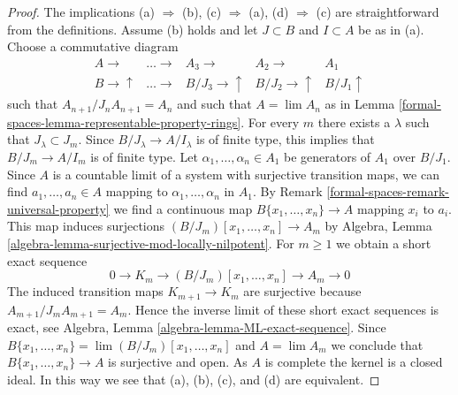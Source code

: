 \begin{proof}
The implications (a) $\Rightarrow$ (b), (c) $\Rightarrow$ (a),
(d) $\Rightarrow$ (c) are straightforward from the definitions.
Assume (b) holds and let $J \subset B$ and $I \subset A$ be as in (a).
Choose a commutative diagram
$$
\begin{array}{ccccc}A \longrightarrow & \ldots \longrightarrow & A_3 \longrightarrow & A_2 \longrightarrow & A_1 \\ B \longrightarrow\uparrow & \ldots \longrightarrow & B/J_3 \longrightarrow\uparrow & B/J_2 \longrightarrow\uparrow & B/J_1 \uparrow\end{array}
$$
such that $A_{n + 1}/J_nA_{n + 1} = A_n$ and such that $A = \lim A_n$ as in
Lemma \ref{formal-spaces-lemma-representable-property-rings}.
For every $m$ there exists a $\lambda$ such that $J_\lambda \subset J_m$.
Since $B/J_\lambda \to A/I_\lambda$ is of finite type, this implies
that $B/J_m \to A/I_m$ is of finite type.
Let $\alpha_1, \ldots, \alpha_n \in A_1$ be generators of $A_1$ over
$B/J_1$. Since $A$ is a countable limit of a system with surjective
transition maps, we can find $a_1, \ldots, a_n \in A$ mapping to
$\alpha_1, \ldots, \alpha_n$ in $A_1$. By
Remark \ref{formal-spaces-remark-universal-property} we find a continuous map
$B\{x_1, \ldots, x_n\} \to A$ mapping $x_i$ to $a_i$. This map
induces surjections $(B/J_m)[x_1, \ldots, x_n] \to A_m$ by
Algebra, Lemma \ref{algebra-lemma-surjective-mod-locally-nilpotent}.
For $m \geq 1$ we obtain a short exact sequence
$$
0 \to K_m \to (B/J_m)[x_1, \ldots, x_n] \to A_m \to 0
$$
The induced transition maps $K_{m + 1} \to K_m$ are surjective because
$A_{m + 1}/J_mA_{m + 1} = A_m$. Hence the inverse limit of these
short exact sequences is exact, see
Algebra, Lemma \ref{algebra-lemma-ML-exact-sequence}.
Since $B\{x_1, \ldots, x_n\} = \lim (B/J_m)[x_1, \ldots, x_n]$
and $A = \lim A_m$
we conclude that $B\{x_1, \ldots, x_n\} \to A$ is surjective and open.
As $A$ is complete the kernel is a closed ideal. In this way we see that
(a), (b), (c), and (d) are equivalent.


\end{proof}
